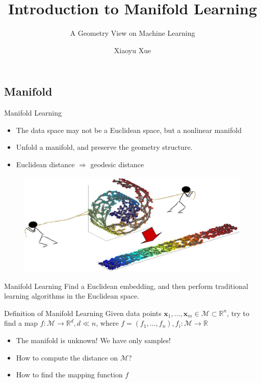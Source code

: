 \documentclass{beamer}
\title{Introduction to Manifold Learning} %
\subtitle{A Geometry View on Machine Learning} %
\author{Xiaoyu Xue}
\newcommand{\bol}[1]{\textbf{#1}}
\begin{document}
  \frame{\maketitle}


  \begin{darkframes}
    \section{Manifold}
    
    \begin{frame}{Manifold Learning}
    \begin{itemize}
    	\item The data space may not be a Euclidean space, but a nonlinear manifold
    	\item Unfold a manifold, and preserve the geometry structure.
    	\item Euclidean distance $\Longrightarrow$ geodesic distance
    \end{itemize}
	\begin{figure}
	\centering
	\includegraphics[scale=0.2]{./figs/fig1.eps}
	\end{figure}
    \end{frame}

    \begin{frame}{Manifold Learning}
    Find a Euclidean embedding, and then perform traditional learning algorithms in the Euclidean space.
	\begin{block}{Definition of Manifold Learning}
	Given data points $\bol{x}_1, \ldots, \bol{x}_m \in \mathcal{M} \subset \mathbb{R}^n$, try to find a map $f : \mathcal{M} \to \mathbb{R}^d, d\ll n$, where $f = (f_1, \ldots, f_n), f_i : \mathcal{M} \to \mathbb{R}$
	\end{block}
 	\begin{itemize}
 		\item The manifold is unknown! We have only samples!
		\item How to compute the distance on $\mathcal{M}$?
		\item How to find the mapping function $f$
 	\end{itemize}
    \end{frame}


\end{darkframes}
\end{document}
